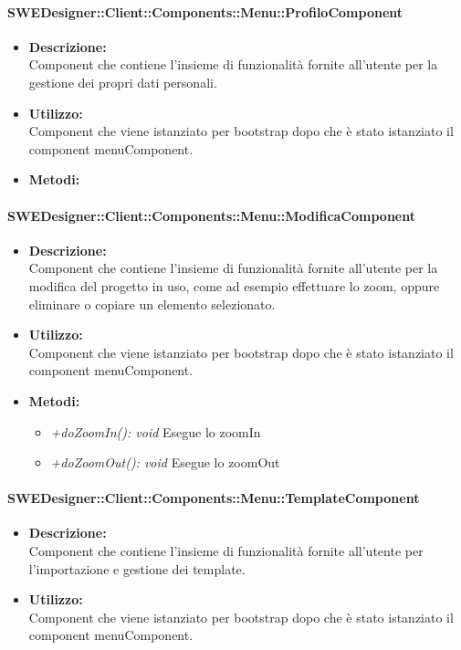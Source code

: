 			\paragraph{SWEDesigner::Client::Components::Menu::ProfiloComponent}
				\begin{itemize}
          			\item \textbf{Descrizione:}\\
          			Component che contiene l’insieme di funzionalità fornite all’utente per la gestione dei propri dati personali.
          			\item \textbf{Utilizzo:}\\
          			Component che viene istanziato per bootstrap dopo che è stato istanziato il component menuComponent.
          			\item \textbf{Metodi:}\\
          		\end{itemize}
			\paragraph{SWEDesigner::Client::Components::Menu::ModificaComponent}
				\begin{itemize}
          			\item \textbf{Descrizione:}\\
          			Component che contiene l’insieme di funzionalità fornite all’utente per la modifica del progetto in uso, come ad esempio effettuare lo zoom, oppure eliminare o copiare un elemento selezionato.
          			\item \textbf{Utilizzo:}\\
          			Component che viene istanziato per bootstrap dopo che è stato istanziato il component menuComponent.
          			\item \textbf{Metodi:}\\
          			\begin{itemize}
          				\item \emph{+doZoomIn(): void}
          				Esegue lo zoomIn
          				\item \emph{+doZoomOut(): void}
          				Esegue lo zoomOut
          			\end{itemize}
          		\end{itemize}
          	\paragraph{SWEDesigner::Client::Components::Menu::TemplateComponent}
				\begin{itemize}
          			\item \textbf{Descrizione:}\\
          			Component che contiene l’insieme di funzionalità fornite all’utente per l’importazione e gestione dei template.
          			\item \textbf{Utilizzo:}\\
          			Component che viene istanziato per bootstrap dopo che è stato istanziato il component menuComponent.
          		\end{itemize}
